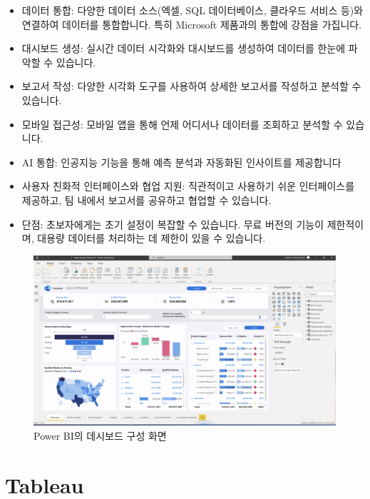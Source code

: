 \documentclass[
  letterpaper,
]{book}
\providecommand{\tightlist}{%
  \setlength{\itemsep}{0pt}\setlength{\parskip}{0pt}}\usepackage{longtable,booktabs,array}
\begin{document}
\begin{itemize}
\tightlist
\item
  데이터 통합: 다양한 데이터 소스(엑셀, SQL 데이터베이스, 클라우드
  서비스 등)와 연결하여 데이터를 통합합니다. 특히 Microsoft 제품과의
  통합에 강점을 가집니다.
\item
  대시보드 생성: 실시간 데이터 시각화와 대시보드를 생성하여 데이터를
  한눈에 파악할 수 있습니다.
\item
  보고서 작성: 다양한 시각화 도구를 사용하여 상세한 보고서를 작성하고
  분석할 수 있습니다.
\item
  모바일 접근성: 모바일 앱을 통해 언제 어디서나 데이터를 조회하고 분석할
  수 있습니다.
\item
  AI 통합: 인공지능 기능을 통해 예측 분석과 자동화된 인사이트를
  제공합니다
\item
  사용자 친화적 인터페이스와 협업 지원: 직관적이고 사용하기 쉬운
  인터페이스를 제공하고, 팀 내에서 보고서를 공유하고 협업할 수 있습니다.
\item
  단점: 초보자에게는 초기 설정이 복잡할 수 있습니다. 무료 버전의 기능이
  제한적이며, 대용량 데이터를 처리하는 데 제한이 있을 수 있습니다.
\end{itemize}

\begin{figure}[H]

{\centering \includegraphics{img/fig18.png}

}

\caption{Power BI의 데시보드 구성 화면}

\end{figure}%

\section{Tableau}\label{tableau}
\end{document}
